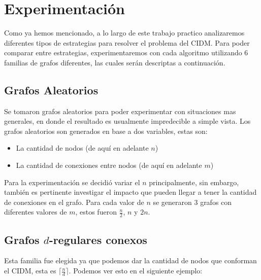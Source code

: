 \section{Experimentación}

Como ya hemos mencionado, a lo largo de este trabajo practico analizaremos diferentes tipos de estrategias para resolver el problema del CIDM. Para poder comparar entre estrategias, experimentaremos con cada algoritmo utilizando 6 familias de grafos diferentes, las cuales serán descriptas a continuación.

\subsection{Grafos Aleatorios}

Se tomaron grafos aleatorios para poder experimentar con situaciones mas generales, en donde el resultado es usualmente impredecible a simple vista. Los grafos aleatorios son generados en base a dos variables, estas son:

\begin{itemize}
	\item La cantidad de nodos (de aquí en adelante $n$)
	\item La cantidad de conexiones entre nodos (de aquí en adelante $m$)
\end{itemize}

Para la experimentación se decidió variar el $n$ principalmente, sin embargo, también es pertinente investigar el impacto que pueden llegar a tener la cantidad de conexiones en el grafo. Para cada valor de $n$ se generaron 3 grafos con diferentes valores de $m$, estos fueron $\frac{n}{2}$, $n$ y $2n$.

\subsection{Grafos $d$-regulares conexos}

Esta familia fue elegida ya que podemos dar la cantidad de nodos que conforman el CIDM, esta es $\lceil\frac{n}{d}\rceil$. Podemos ver esto en el siguiente ejemplo:

